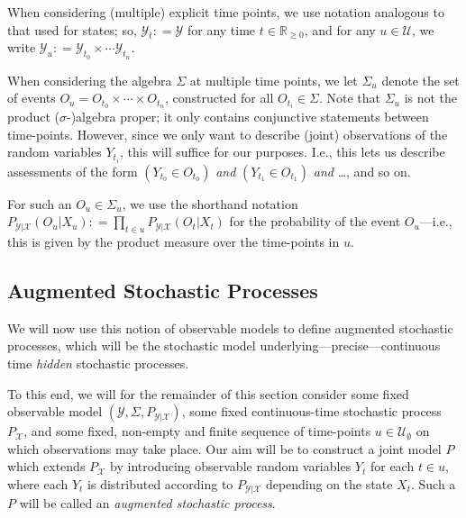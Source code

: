 \documentclass[twoside,11pt]{article}
\newcommand{\reals}{\mathbb{R}}
\newcommand{\realsnonneg}{\reals_{\geq 0}}
\newcommand{\states}{\mathcal{X}}
\newcommand{\observs}{\mathcal{Y}}
\newcommand{\coloneqq}{:\!=}
\begin{document}
When considering (multiple) explicit time points, we use notation analogous to that used for states; so, $\observs_t\coloneqq\observs$ for any time $t\in\realsnonneg$, and for any $u\in\mathcal{U}$, we write $\observs_u\coloneqq \observs_{t_0}\times\cdots\observs_{t_n}$. 

When considering the algebra $\Sigma$ at multiple time points, we let $\Sigma_u$ denote the set of events $O_u=O_{t_0}\times\cdots\times O_{t_n}$, constructed for all $O_{t_i}\in\Sigma$. Note that $\Sigma_u$ is not the product ($\sigma$-)algebra proper; it only contains conjunctive statements between time-points. However, since we only want to describe (joint) observations of the random variables $Y_{t_i}$, this will suffice for our purposes. I.e., this lets us describe assessments of the form $(Y_{t_0}\in O_{t_0})$ \emph{and} $(Y_{t_1}\in O_{t_1})$ \emph{and} \ldots, and so on.  

For such an $O_u\in\Sigma_u$, we use the shorthand notation $P_{\observs\vert\states}(O_u\vert X_u)\coloneqq \prod_{t\in u}P_{\observs\vert\states}(O_t\vert X_t)$ for the probability of the event $O_u$---i.e., this is given by the product measure over the time-points in $u$.


\subsection{Augmented Stochastic Processes}\label{sec:aug_stochastic_processes}
We will now use this notion of observable models to define augmented stochastic processes, which will be the stochastic model underlying---precise---continuous time \emph{hidden} stochastic processes. 

To this end, we will for the remainder of this section consider some fixed observable model $(\observs,\Sigma,P_{\observs\vert\states})$, some fixed continuous-time stochastic process $P_\states$, and some fixed, non-empty and finite sequence of time-points $u\in\mathcal{U}_{\emptyset}$ on which observations may take place. Our aim will be to construct a joint model $P$ which extends $P_\states$ by introducing observable random variables $Y_t$ for each $t\in u$, where each $Y_t$ is distributed according to $P_{\observs\vert\states}$ depending on the state $X_t$. Such a $P$ will be called an \emph{augmented stochastic process}.
\end{document}

